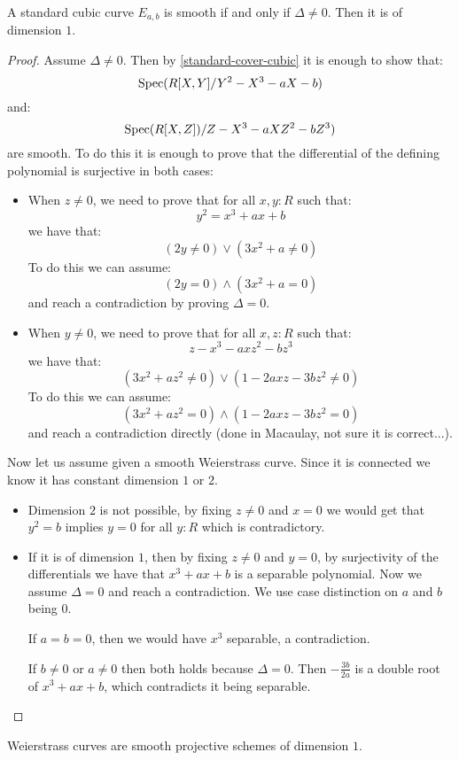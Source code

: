 \begin{lemma}\label{smoothness-iff-discriminant-invertible}
A standard cubic curve $E_{a,b}$ is smooth if and only if $\Delta\not=0$. Then it is of dimension $1$.
\end{lemma}

\begin{proof}
Assume $\Delta\not=0$. Then by \cref{standard-cover-cubic} it is enough to show that:
\[\operatorname{Spec}(R[X,Y]/Y^2-X^3-aX-b)\]
and:
\[\operatorname{Spec}(R[X,Z])/Z-X^3-aXZ^2-bZ^3)\]
are smooth. To do this it is enough to prove that the differential of the defining polynomial is surjective in both cases:
\begin{itemize}
\item When $z\not=0$, we need to prove that for all $x,y:R$ such that:
\[y^2 = x^3+ a x + b\]
we have that:
\[(2y\not=0) \lor (3x^2 + a \not= 0)\]
To do this we can assume:
\[(2y=0)\land(3x^2+a=0)\]
and reach a contradiction by proving $\Delta=0$.
\item When $y\not=0$, we need to prove that for all $x,z:R$ such that:
\[z-x^3-axz^2-bz^3\]
we have that:
\[(3x^2+az^2 \not= 0)\lor (1-2axz-3bz^2 \not=0)\]
To do this we can assume:
\[(3x^2+az^2 = 0)\land (1-2axz-3bz^2 =0)\]
and reach a contradiction directly (done in Macaulay, not sure it is correct...).
\end{itemize}
Now let us assume given a smooth Weierstrass curve. Since it is connected we know it has constant dimension $1$ or $2$.
\begin{itemize}
\item Dimension $2$ is not possible, by fixing $z\not=0$ and $x=0$ we would get that $y^2=b$ implies $y=0$ for all $y:R$ which is contradictory.
\item If it is of dimension $1$, then by fixing $z\not=0$ and $y=0$, by surjectivity of the differentials we have that $x^3+ a x + b$ is a separable polynomial. Now we assume $\Delta=0$ and reach a contradiction. We use case distinction on $a$ and $b$ being $0$.

If $a=b=0$, then we would have $x^3$ separable, a contradiction.

If $b\not=0$ or $a\not=0$ then both holds because $\Delta=0$. Then $-\frac{3b}{2a}$ is a double root of $x^3+ a x + b$, which contradicts it being separable.
\end{itemize}
\end{proof}

\begin{corollary}
Weierstrass curves are smooth projective schemes of dimension $1$.
\end{corollary}

